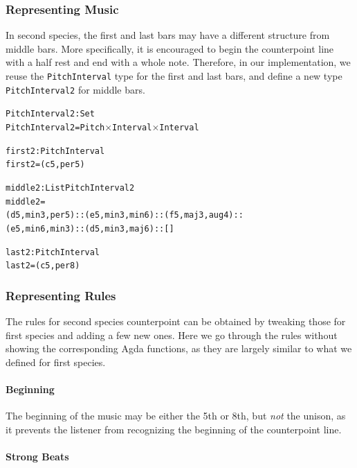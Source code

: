 \subsubsection{Representing Music}

In second species, the first and last bars may have a different structure
from middle bars.
More specifically, it is encouraged to begin the counterpoint line with
a half rest and end with a whole note.
Therefore, in our implementation, we reuse the \texttt{PitchInterval} 
type for the first and last bars, and define a new type
\texttt{PitchInterval2} for middle bars.

\begin{alltt}
PitchInterval2 : Set
PitchInterval2 = Pitch \(\times\) Interval \(\times\) Interval

first2 : PitchInterval
first2 = (c 5 , per5)

middle2 : List PitchInterval2
middle2 =
  (d 5 , min3 , per5) :: (e 5 , min3 , min6) :: (f 5 , maj3 , aug4) ::
  (e 5 , min6 , min3) :: (d 5 , min3 , maj6) :: []

last2 : PitchInterval
last2 = (c 5 , per8)
\end{alltt}

\subsubsection{Representing Rules}

The rules for second species counterpoint can be obtained by
tweaking those for first species and adding a few new ones.
Here we go through the rules without showing the corresponding
Agda functions, as they are largely similar to what we defined for
first species.

\paragraph{Beginning}

The beginning of the music may be either the 5th or 8th, but
\emph{not} the unison, as it prevents the listener from recognizing
the beginning of the counterpoint line.

\paragraph{Strong Beats}

